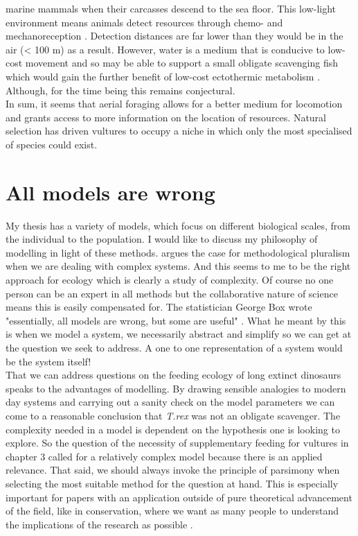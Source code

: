 marine mammals when their carcasses descend to the sea floor. This low-light environment means animals detect resources through chemo- and mechanoreception \citep{ruxton2004energetic}. Detection distances are far lower than they would be in the air (< 100 m) as a result. However, water is a medium that is conducive to low-cost movement \citep{tucker1975energetic} and so may be able to support a small obligate scavenging fish which would gain the further benefit of low-cost ectothermic metabolism \citep{ruxton2004energetic}. Although, for the time being this remains conjectural. \\ \indent In sum, it seems that aerial foraging allows for a better medium for locomotion and grants access to more information on the location of resources. Natural selection has driven vultures to occupy a niche in which only the most specialised of species could exist.  


\section{\uppercase{A}ll models are wrong}
My thesis has a variety of models, which focus on different biological scales, from the individual to the population. I would like to discuss my philosophy of modelling in light of these methods. \cite{norgaard1989case} argues the case for methodological pluralism when we are dealing with complex systems. And this seems to me to be the right approach for ecology which is clearly a study of complexity. Of course no one person can be an expert in all methods but the collaborative nature of science means this is easily compensated for. The statistician George Box wrote "essentially, all models are wrong, but some are useful" \citep{box1987empirical}. What he meant by this is when we model a system, we necessarily abstract and simplify so we can get at the question we seek to address. A one to one representation of a system would be the system itself! \\ \indent That we can address questions on the feeding ecology of long extinct dinosaurs speaks to the advantages of modelling. By drawing sensible analogies to modern day systems and carrying out a sanity check on the model parameters we can come to a reasonable conclusion that \textit{T.rex} was not an obligate scavenger. The complexity needed in a model is dependent on the hypothesis one is looking to explore. So the question of the necessity of supplementary feeding for vultures in chapter 3 called for a relatively complex model because there is an applied relevance. That said, we should always invoke the principle of parsimony when selecting the most suitable method for the question at hand. This is especially important for papers with an application outside of pure theoretical advancement of the field, like in conservation, where we want as many people to understand the implications of the research as possible \citep{kane2012suggestion}.  

